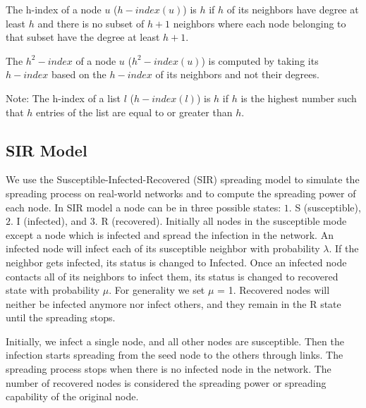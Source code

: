 \documentclass[12pt,3p]{article}
\begin{document}
The h-index of a node $u$ ($h-index(u)$) is $h$ if $h$ of its neighbors have degree at least $h$ and there is no subset of $h+1$ neighbors where each node belonging to that subset have the degree at least $h+1$.

The $h^2-index$ of a node $u$ ($h^2-index(u)$) is computed by taking its $h-index$ based on the $h-index$ of its neighbors and not their degrees.

Note: The h-index of a list $l$ ($h-index(l)$) is $h$ if $h$ is the highest number such that $h$ entries of the list are equal to or greater than $h$.


\subsection{SIR Model}\label{secsir}

We use the Susceptible-Infected-Recovered (SIR) spreading model to simulate the spreading process on real-world networks and to compute the spreading power of each node. In SIR model a node can be in three possible states: $1.$ S (susceptible), $2.$ I (infected), and $3.$ R (recovered). Initially all nodes in the susceptible mode except a node which is infected and spread the infection in the network. An infected node will infect each of its susceptible neighbor with probability $\lambda$. If the neighbor gets infected, its status is changed to Infected. Once an infected node contacts all of its neighbors to infect them, its status is changed to recovered state with probability $\mu$. For generality we set $\mu$ = 1. Recovered nodes will neither be infected anymore nor infect others, and they remain in the R state until the spreading stops. 

Initially, we infect a single node, and all other nodes are susceptible. Then the infection starts spreading from the seed node to the others through links. The spreading process stops when there is no infected node in the network. The number of recovered nodes is considered the spreading power or spreading capability of the original node. 
\end{document}
